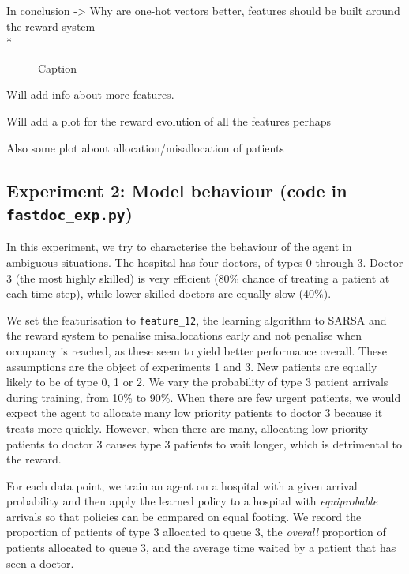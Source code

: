 \documentclass[11point]{article}
\begin{document}
In conclusion -> Why are one-hot vectors better, features should be built around the reward system\\*


\pgfplotsset{width=8cm,compat=1.8}
\begin{figure}
    \centering

\begin{adjustwidth*}{-0.2cm}{}
    
    \caption{Caption}
    \label{fig:my_label}

\end{adjustwidth*}
\end{figure}

Will add info about more features.

Will add a plot for the reward evolution of all the features perhaps

Also some plot about allocation/misallocation of patients


\subsection{Experiment 2: Model behaviour (code in \texttt{fastdoc\_exp.py})}
In this experiment, we try to characterise the behaviour of the agent in ambiguous situations.
The hospital has four doctors, of types 0 through 3. Doctor 3 (the most highly skilled) is very efficient (80\% chance of treating a patient at each time step), while lower skilled doctors are equally slow (40\%).

We set the featurisation to \texttt{feature\_12}, the learning algorithm to SARSA and the reward system to penalise misallocations early and not penalise when occupancy is reached, as these seem to yield better performance overall. These assumptions are the object of experiments 1 and 3.
New patients are equally likely to be of type 0, 1 or 2. 
We vary the probability of type 3 patient arrivals during training, from 10\% to 90\%.
When there are few urgent patients, we would expect the agent to allocate many low priority patients to doctor 3 because it treats more quickly. However, when there are many, allocating low-priority patients to doctor 3 causes type 3 patients to wait longer, which is detrimental to the reward.

For each data point, we train an agent on a hospital with a given arrival probability and then apply the learned policy to a hospital with \emph{equiprobable} arrivals so that policies can be compared on equal footing. 
We record the proportion of patients of type 3 allocated to queue 3, the \emph{overall} proportion of patients allocated to queue 3, and the average time waited by a patient that has seen a doctor.
\end{document}
